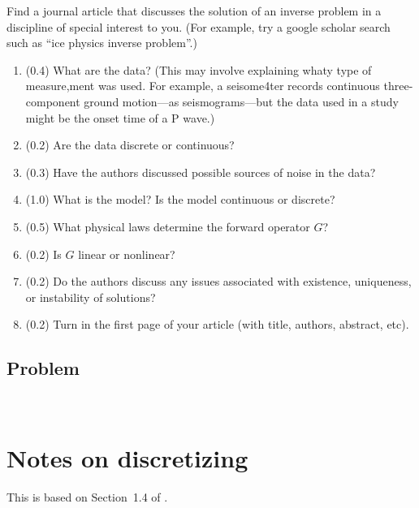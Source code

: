 \documentclass[11pt,titlepage,fleqn]{article}
\begin{document}
Find a journal article that discusses the solution of an inverse problem in a discipline of special interest to you. (For example, try a google scholar search such as ``ice physics inverse problem''.)
%
\begin{enumerate}
\item (0.4) What are the data? (This may involve explaining whaty type of measure,ment was used. For example, a seisome4ter records continuous three-component ground motion---as seismograms---but the data used in a study might be the onset time of a P wave.)
\item (0.2) Are the data discrete or continuous?
\item (0.3) Have the authors discussed possible sources of noise in the data?
\item (1.0) What is the model? Is the model continuous or discrete?
\item (0.5) What physical laws determine the forward operator $G$?
\item (0.2) Is $G$ linear or nonlinear?
\item (0.2) Do the authors discuss any issues associated with existence, uniqueness, or instability of solutions?
\item (0.2) Turn in the first page of your article (with title, authors, abstract, etc).
\end{enumerate}


\subsection*{Problem} \howmuchtime\

\nocite{Aster}




\appendix

\pagebreak

\section{Notes on discretizing}

This is based on Section~1.4 of \citet{Aster}.
\end{document}
